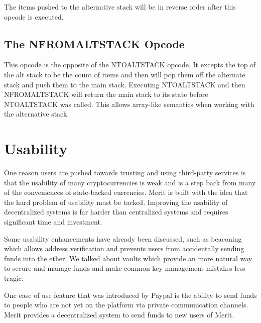 \documentclass{article}
\begin{document}
The items pushed to the alternative stack will be in reverse order after this opcode is
executed.

\subsection{The NFROMALTSTACK Opcode}

\begin{center}
\end{center}

This opcode is the opposite of the NTOALTSTACK opcode. It excepts the top of the
alt stack to be the count of items and then will pop them off the alternate stack
and push them to the main stack. Executing NTOALTSTACK and then NFROMALTSTACK will
return the main stack to its state before NTOALTSTACK was called. This allows
array-like semantics when working with the alternative stack.

\section{Usability}

One reason users are pushed towards trusting and using third-party services is that
the usability of many cryptocurrencies is weak and is a step back from many
of the conveniences of state-backed currencies. Merit is built with the idea
that the hard problem of usability must be tacked. Improving the usability of
decentralized systems is far harder than centralized systems and requires significant
time and investment.

Some usability enhancements have already been discussed, such as beaconing which
allows address verification and prevents users from accidentally sending funds into
the ether. We talked about vaults which provide an more natural way to secure and
manage funds and make common key management mistakes less tragic.

One ease of use feature that was introduced by Paypal is the ability to send
funds to people who are not yet on the platform via private communication channels.
Merit provides a decentralized system to send funds to new users of Merit.
\end{document}
